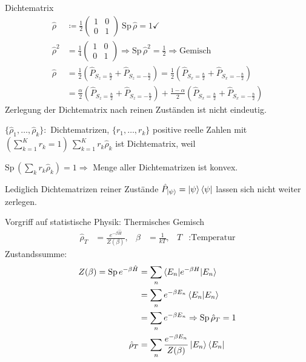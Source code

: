 	Dichtematrix
		\begin{align*}
			\hat{\rho} &\coloneqq \frac{1}{2}
			\begin{pmatrix}
			1 & 0 \\
			0 & 1
			\end{pmatrix}
			~ \mathrm{Sp}\, \hat{\rho} = 1 \checkmark \\
			\hat{\rho}^2 &= \frac{1}{4} 
			\begin{pmatrix}
				1 & 0 \\
				0 & 1
			\end{pmatrix}
			\Rightarrow \mathrm{Sp}\, \hat{\rho}^2 = \frac{1}{2} \Rightarrow \text{Gemisch} \\
			\hat{\rho} &= \frac{1}{2} 
			\left(
				\hat{P}_{S_z = \frac{\hbar}{2}} + \hat{P}_{S_z = -\frac{\hbar}{2}}
			\right) =
			\frac{1}{2}
			\left(
				\hat{P}_{S_x = \frac{\hbar}{2}} + \hat{P}_{S_x = -\frac{\hbar}{2}}
			\right) \\
			&= \frac{\alpha}{2}
			\left(
			\hat{P}_{S_z = \frac{\hbar}{2}} + \hat{P}_{S_z = -\frac{\hbar}{2}}
			\right) +
			\frac{1 - \alpha}{2}
			\left(
			\hat{P}_{S_x = \frac{\hbar}{2}} + \hat{P}_{S_x = -\frac{\hbar}{2}}
			\right)
		\end{align*}
	Zerlegung der Dichtematrix nach reinen Zuständen ist nicht eindeutig.
	
	$\{\hat{\rho}_1, \ldots, \hat{\rho}_k\}:$ Dichtematrizen, $\{r_1, \ldots, r_k\}$ positive reelle Zahlen mit $(\sum_{k = 1}^{K} r_k = 1) ~\sum_{k = 1}^{K} r_k \hat{\rho}_k$ ist Dichtematrix, weil 
	
	$\mathrm{Sp}\, (\sum_k r_k \hat{\rho}_k) = 1 \Rightarrow$ Menge aller Dichtematrizen ist konvex.
	
	Lediglich Dichtematrizen reiner Zustände $\hat{P}_{\ket{\psi}} = \ket{\psi} \bra{\psi}$ lassen sich nicht weiter zerlegen.
	
	Vorgriff auf statistische Physik: Thermisches Gemisch
		\begin{align*}
			\hat{\rho}_T &= \frac{e^{-\beta \hat{H}}}{Z (\beta)} ,&
			\beta &= \frac{1}{k T},&
			T&: \text{Temperatur} 
		\end{align*}
	Zustandssumme: 
		\begin{align*}
			Z(\beta) = \mathrm{Sp}\, e^{-\beta \hat{H}} 
			&= \sum_n \braket{E_n | e^{-\beta H} | E_n} \\
			&= \sum_n e^{-\beta E_n} \braket{E_n | E_n} \\
			&= \sum_n e^{-\beta E_n}
		\Rightarrow \mathrm{Sp}\, \hat{\rho}_T = 1 \\
		\hat{\rho}_T &= \sum_n \frac{e^{-\beta E_n}}{Z (\beta)} \ket{E_n} \bra{E_n}
		\end{align*}

